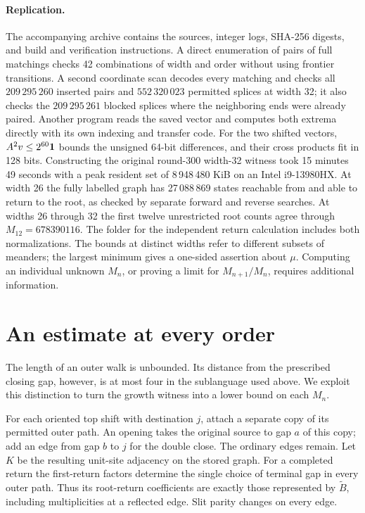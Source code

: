 \documentclass[11pt]{article}
\begin{document}
\paragraph{Replication.}
The accompanying archive contains the sources, integer logs, SHA-256 digests, and build and verification instructions. A direct enumeration of pairs of full matchings checks 42 combinations of width and order without using frontier transitions. A second coordinate scan decodes every matching and checks all \(209\,295\,260\) inserted pairs and \(552\,320\,023\) permitted splices at width 32; it also checks the \(209\,295\,261\) blocked splices where the neighboring ends were already paired. Another program reads the saved vector and computes both extrema directly with its own indexing and transfer code. For the two shifted vectors, \(A^2v\le 2^{60}{\bf1}\) bounds the unsigned 64-bit differences, and their cross products fit in 128 bits. Constructing the original round-300 width-32 witness took 15 minutes 49 seconds with a peak resident set of 8\,948\,480 KiB on an Intel i9-13980HX. At width 26 the fully labelled graph has 27\,088\,869 states reachable from and able to return to the root, as checked by separate forward and reverse searches. At widths 26 through 32 the first twelve unrestricted root counts agree through \(M_{12}=678390116\). The folder for the independent return calculation includes both normalizations. The bounds at distinct widths refer to different subsets of meanders; the largest minimum gives a one-sided assertion about \(\mu\). Computing an individual unknown \(M_n\), or proving a limit for \(M_{n+1}/M_n\), requires additional information.

\section{An estimate at every order}\label{uniform}
The length of an outer walk is unbounded. Its distance from the prescribed closing gap, however, is at most four in the sublanguage used above. We exploit this distinction to turn the growth witness into a lower bound on each \(M_n\).

For each oriented top shift with destination \(j\), attach a separate copy of its permitted outer path. An opening takes the original source to gap \(a\) of this copy; add an edge from gap \(b\) to \(j\) for the double close. The ordinary edges remain. Let \(K\) be the resulting unit-site adjacency on the stored graph. For a completed return the first-return factors determine the single choice of terminal gap in every outer path. Thus its root-return coefficients are exactly those represented by \(\widetilde B\), including multiplicities at a reflected edge. Slit parity changes on every edge.
\end{document}
